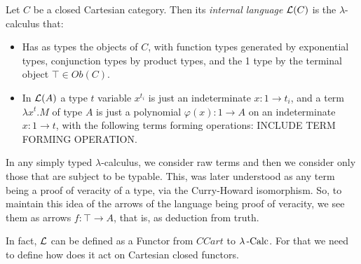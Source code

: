 \begin{definition}
\begin{definition}
  Let $C$ be a closed Cartesian category. Then its \emph{internal language} $\mathcal{L} (C)$ is the $\lambda$-calculus that:
\begin{itemize}
\item Has as types the objects of $C$, with function types generated by exponential types, conjunction types by product types, and the 1 type by the terminal object $\top \in Ob(C)$.%
\item In $\mathcal{L}(A)$ a type $t$ variable $x^{t_i}$ is just an indeterminate  $x:1 \to t_i$, and a term $\lambda x^t. M$ of type $A$ is just a polynomial $\varphi(x):1 \to A$ on an indeterminate $x: 1 \to t$, with the following terms forming operations:
  INCLUDE TERM FORMING OPERATION.
  \end{itemize}

\end{definition}

\begin{remark}
  In any simply typed $\lambda$-calculus, we consider raw terms and then we consider only those that are subject to be typable. This, was later understood as any term being a proof of veracity of a type, via the Curry-Howard isomorphism. So, to maintain this idea of the arrows of the language being proof of veracity, we see them as arrows $f:\top \to A$, that is, as deduction from truth. \\
\end{remark}


 In fact, $\mathcal{L} $ can be defined as a Functor from $CCart$ to $\lambda\operatorname{-Calc}$. For that we need to define how does it act on Cartesian closed functors. \\


\end{definition}
